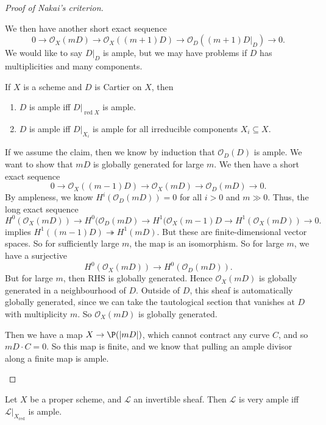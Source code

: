 \documentclass[a4paper]{article}
\DeclareMathOperator\red{red}
\begin{document}
\begin{proof}[Proof of Nakai's criterion]
\begin{itemize}
      We then have another short exact sequence
      \[
        0 \to \mathcal{O}_X(mD) \to \mathcal{O}_X((m + 1)D) \to \mathcal{O}_D((m + 1)D|_D) \to 0.
      \]
      We would like to say $D|_D$ is ample, but we may have problems if $D$ has multiplicities and many components.
      \begin{claim}
        If $X$ is a scheme and $D$ is Cartier on $X$, then
        \begin{enumerate}
          \item $D$ is ample iff $D|_{\red X}$ is ample.
          \item $D$ is ample iff $D|_{X_i}$ is ample for all irreducible components $X_i \subseteq X$.
        \end{enumerate}
      \end{claim}
      If we assume the claim, then we know by induction that $\mathcal{O}_D(D)$ is ample. We want to show that $mD$ is globally generated for large $m$. We then have a short exact sequence
      \[
        0 \to \mathcal{O}_X((m - 1)D) \to \mathcal{O}_X(mD) \to \mathcal{O}_D(mD) \to 0.
      \]
      By ampleness, we know $H^i(\mathcal{O}_D(mD)) = 0$ for all $i > 0$ and $m \gg 0$. Thus, the long exact sequence
      \[
        H^0(\mathcal{O}_X(mD)) \to H^0(\mathcal{O}_D(mD) \to H^1(\mathcal{O}_X(m - 1)D \to H^1(\mathcal{O}_X(mD)) \to 0.
      \]
      implies $H^1((m - 1)D) \twoheadrightarrow H^1(mD)$. But these are finite-dimensional vector spaces. So for sufficiently large $m$, the map is an isomorphism. So for large $m$, we have a surjective
      \[
        H^0(\mathcal{O}_X(mD)) \to H^0(\mathcal{O}_D(mD)).
      \]
      But for large $m$, then RHS is globally generated. Hence $\mathcal{O}_X(mD)$ is globally generated in a neighbourhood of $D$. Outside of $D$, this sheaf is automatically globally generated, since we can take the tautological section that vanishes at $D$ with multiplicity $m$. So $\mathcal{O}_X(mD)$ is globally generated.

      Then we have a map $X \to \P(|mD|)$, which cannot contract any curve $C$, and so $mD \cdot C = 0$. So this map is finite, and we know that pulling an ample divisor along a finite map is ample.\qedhere
  \end{itemize}
\end{proof}

\begin{prop}
  Let $X$ be a proper scheme, and $\mathcal{L}$ an invertible sheaf. Then $\mathcal{L}$ is very ample iff $\mathcal{L}|_{X_{\red}}$ is ample.
\end{prop}
\end{document}

